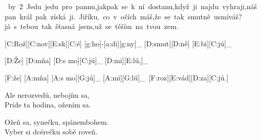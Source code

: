 \leavevmode
\hbox{%
\divide\hsize by 2
\vbox{Jedu jedu pro pannu,\\
jakpak se k ní dostanu,\\
když ji najdu vyhraji,\\
náš pan král pak získá ji.}%
\vbox{Jiříku, co v očích máš,\\
že se tak smutně usmíváš?\\
já s tebou tak šťasná jsem,\\
už se těším na tvou zem.}}



[C:Rož][C:nov][E:sk][C:é] [g:ho]-[a:di][g:ny]_ [D:smut][D:ně] [E:bi][C:jú]_\

[D:Že] [D:mňa] [D:s mo][C:jú]_ [D:mi][E:lú,]_\

[F:že] [A:mňa] [A:s mo][G:jú]_ [A:mi][G:lú]_\
[F:roz][E:vád][D:za][C:jú.]\

Ale nerozvedů, nebojím sa,\\
Príde ta hodina, ožením sa.

Ožeň sa, synečku, spánembohem.\\
Vyber si dcérečku sobě roveň.

\bye
